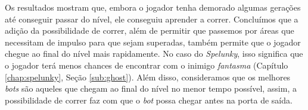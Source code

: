 Os resultados mostram que, embora o jogador tenha demorado algumas gerações até
conseguir passar do nível, ele conseguiu aprender a correr. Concluímos que a
adição da possibilidade de correr, além de permitir que passemos por áreas que
necessitam de impulso para que sejam superadas, também permite que o jogador
chegue ao final do nível mais rapidamente. No caso do \textit{Spelunky}, isso
significa que o jogador terá menos chances de encontrar com o inimigo
\textit{fantasma} (Capítulo \ref{chap:spelunky}, Seção \ref{sub:ghost}). Além
disso, consideramos que os melhores \textit{bots} são aqueles que chegam ao
final do nível no menor tempo possível, assim, a possibilidade de correr faz
com que o \textit{bot} possa chegar antes na porta de saída.
